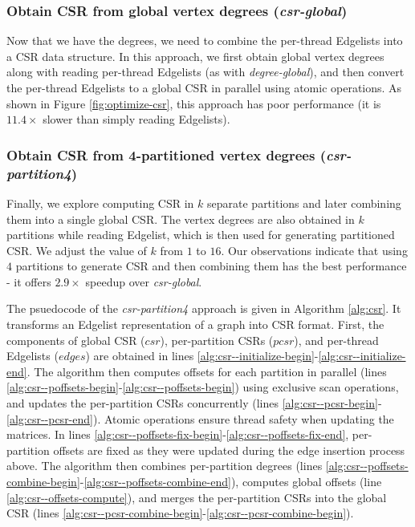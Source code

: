 \subsubsection{Obtain CSR from global vertex degrees (\textit{csr-global})}
\label{sec:csr-csr-global}

Now that we have the degrees, we need to combine the per-thread Edgelists into a CSR data structure. In this approach, we first obtain global vertex degrees along with reading per-thread Edgelists (as with \textit{degree-global}), and then convert the per-thread Edgelists to a global CSR in parallel using atomic operations. As shown in Figure \ref{fig:optimize-csr}, this approach has poor performance (it is $11.4\times$ slower than simply reading Edgelists).


\subsubsection{Obtain CSR from 4-partitioned vertex degrees (\textit{csr-partition4})}
\label{sec:csr-csr-partition4}

Finally, we explore computing CSR in $k$ separate partitions and later combining them into a single global CSR. The vertex degrees are also obtained in $k$ partitions while reading Edgelist, which is then used for generating partitioned CSR. We adjust the value of $k$ from $1$ to $16$. Our observations indicate that using $4$ partitions to generate CSR and then combining them has the best performance - it offers $2.9\times$ speedup over \textit{csr-global}.

The psuedocode of the \textit{csr-partition4} approach is given in Algorithm \ref{alg:csr}. It transforms an Edgelist representation of a graph into CSR format. First, the components of global CSR ($csr$), per-partition CSRs ($pcsr$), and per-thread Edgelists ($edges$) are obtained in lines \ref{alg:csr--initialize-begin}-\ref{alg:csr--initialize-end}. The algorithm then computes offsets for each partition in parallel (lines \ref{alg:csr--poffsets-begin}-\ref{alg:csr--poffsets-begin}) using exclusive scan operations, and updates the per-partition CSRs concurrently (lines \ref{alg:csr--pcsr-begin}-\ref{alg:csr--pcsr-end}). Atomic operations ensure thread safety when updating the matrices. In lines \ref{alg:csr--poffsets-fix-begin}-\ref{alg:csr--poffsets-fix-end}, per-partition offsets are fixed as they were updated during the edge insertion process above. The algorithm then combines per-partition degrees (lines \ref{alg:csr--poffsets-combine-begin}-\ref{alg:csr--poffsets-combine-end}), computes global offsets (line \ref{alg:csr--offsets-compute}), and merges the per-partition CSRs into the global CSR (lines \ref{alg:csr--pcsr-combine-begin}-\ref{alg:csr--pcsr-combine-begin}).
